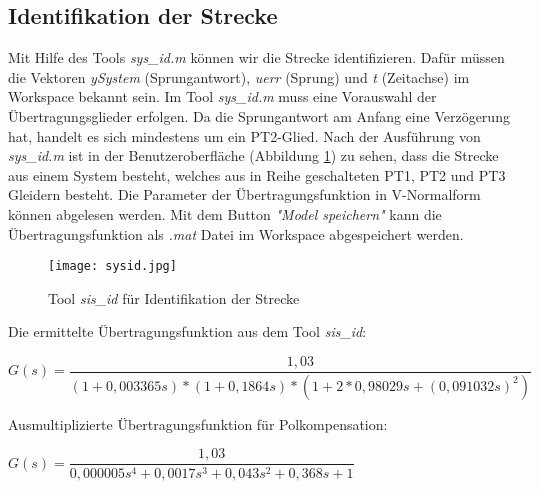 \subsection{Identifikation der Strecke}
Mit Hilfe des Tools \textit{sys\_id.m} können wir die Strecke identifizieren. Dafür müssen die Vektoren \textit{ySystem} (Sprungantwort), \textit{uerr} (Sprung) und \textit{t} (Zeitachse) im Workspace bekannt sein. Im Tool \textit{sys\_id.m} muss eine Vorauswahl der Übertragungsglieder erfolgen. Da die Sprungantwort am Anfang eine Verzögerung hat, handelt es sich mindestens um ein PT2-Glied. Nach der Ausführung von \textit{sys\_id.m} ist in der Benutzeroberfläche (Abbildung \ref{pic_sis_id}) zu sehen, dass die Strecke aus einem System besteht, welches aus in Reihe geschalteten PT1, PT2 und PT3 Gleidern besteht. Die Parameter der Übertragungsfunktion in V-Normalform können abgelesen werden. 
Mit dem Button \textit{"Model speichern"} kann die Übertragungsfunktion als \textit{.mat} Datei im Workspace abgespeichert werden.

\newpage

\begin{figure}[h]
	\begin{center}
		\texttt{[image: sysid.jpg]}
		\caption{Tool \textit{sis\_id} für Identifikation der Strecke}
       \label{pic_sis_id}
	\end{center} 
\end{figure}

Die ermittelte Übertragungsfunktion aus dem Tool \textit{sis\_id}: 

\begin{center}
$ G(s) = \dfrac{1,03}{(1 + 0,003365s) * (1 + 0,1864s) * (1 + 2*0,98029s + (0,091032s)^{2}) }$
\end{center}

Ausmultiplizierte Übertragungsfunktion für Polkompensation:

\begin{center}
$ G(s) =  \dfrac{1,03}{0,000005s^{4} + 0,0017s^{3	} + 0,043s^{2} + 0,368s + 1 } $
\end{center}
